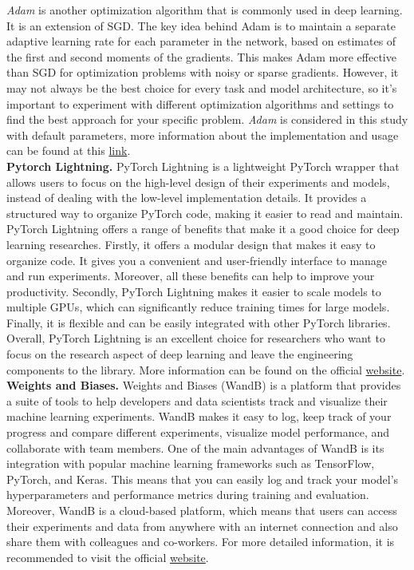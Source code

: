 \textit{Adam} is another optimization algorithm that is commonly used in deep learning. It is an extension of SGD. The key idea behind Adam is to maintain a separate adaptive learning rate for each parameter in the network, based on estimates of the first and second moments of the gradients. This makes Adam more effective than SGD for optimization problems with noisy or sparse gradients. However, it may not always be the best choice for every task and model architecture, so it's important to experiment with different optimization algorithms and settings to find the best approach for your specific problem. \textit{Adam} is considered in this study with default parameters, more information about the implementation and usage can be found at this \href{https://pytorch.org/docs/stable/generated/torch.optim.Adam.html}{link}.\\

\textbf{Pytorch Lightning.} PyTorch Lightning is a lightweight PyTorch wrapper that allows users to focus on the high-level design of their experiments and models, instead of dealing with the low-level implementation details. It provides a structured way to organize PyTorch code, making it easier to read and maintain.\\

PyTorch Lightning offers a range of benefits that make it a good choice for deep learning researches. Firstly, it offers a modular design that makes it easy to organize code. It gives you a convenient and user-friendly interface to manage and run experiments. Moreover, all these benefits can help to improve your productivity. Secondly, PyTorch Lightning makes it easier to scale models to multiple GPUs, which can significantly reduce training times for large models. Finally, it is flexible and can be easily integrated with other PyTorch libraries. Overall, PyTorch Lightning is an excellent choice for researchers who want to focus on the research aspect of deep learning and leave the engineering components to the library. More information can be found on the official \href{https://www.pytorchlightning.ai/index.html}{website}.\\

\textbf{Weights and Biases.} Weights and Biases (WandB) is a platform  that provides a suite of tools to help developers and data scientists track and visualize their machine learning experiments. WandB makes it easy to log, keep track of your progress and compare different experiments, visualize model performance, and collaborate with team members. One of the main advantages of WandB is its integration with popular machine learning frameworks such as TensorFlow, PyTorch, and Keras. This means that you can easily log and track your model's hyperparameters and performance metrics during training and evaluation. Moreover, WandB is a cloud-based platform, which means that users can access their experiments and data from anywhere with an internet connection and also share them with colleagues and co-workers. For more detailed information, it is recommended to visit the official \href{https://wandb.ai/site}{website}.\\ 

